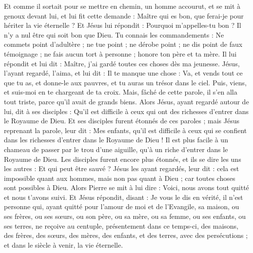 \begin{multicols}{2}
Et comme il sortait pour se mettre en chemin, un homme accourut, et se mit à genoux devant lui, et lui fit cette demande : Maître qui es bon, que ferai-je pour hériter la vie éternelle ?
Et Jésus lui répondit : Pourquoi m'appelles-tu bon ? Il n'y a nul être qui soit bon que Dieu.
Tu connais les commandements : Ne commets point d’adultère ; ne tue point ; ne dérobe point ; ne dis point de faux témoignage ; ne fais aucun tort à personne ; honore ton père et ta mère.
Il lui répondit et lui dit : Maître, j'ai gardé toutes ces choses dès ma jeunesse.
Jésus, l’ayant regardé, l'aima, et lui dit : Il te manque une chose : Va, et vends tout ce que tu as, et donne-le aux pauvres, et tu auras un trésor dans le ciel. Puis, viens, et suis-moi en te chargeant de ta croix.
Mais, fâché de cette parole, il s'en alla tout triste, parce qu'il avait de grands biens.
Alors Jésus, ayant regardé autour de lui, dit à ses disciples : Qu’il est difficile à ceux qui ont des richesses d’entrer dans le Royaume de Dieu.
Et ses disciples furent étonnés de ces paroles ; mais Jésus reprenant la parole, leur dit : Mes enfants, qu'il est difficile à ceux qui se confient dans les richesses d'entrer dans le Royaume de Dieu !
Il est plus facile à un chameau de passer par le trou d'une aiguille, qu’à un riche d’entrer dans le Royaume de Dieu.
Les disciples furent encore plus étonnés, et ils se dire les uns les autres : Et qui peut être sauvé ?
Jésus les ayant regardés, leur dit : cela est impossible quant aux hommes, mais non pas quant à Dieu ; car toutes choses sont possibles à Dieu.
Alors Pierre se mit à lui dire : Voici, nous avons tout quitté et nous t'avons suivi.
Et Jésus répondit, disant : Je vous le dis en vérité, il n’est personne qui, ayant quitté pour l'amour de moi et de l’Evangile, sa maison, ou ses frères, ou ses sœurs, ou son père, ou sa mère, ou sa femme, ou ses enfants, ou ses terres,
ne reçoive au centuple, présentement dans ce temps-ci, des maisons, des frères, des sœurs, des mères, des enfants, et des terres, avec des persécutions ; et dans le siècle à venir, la vie éternelle.

\end{multicols}
